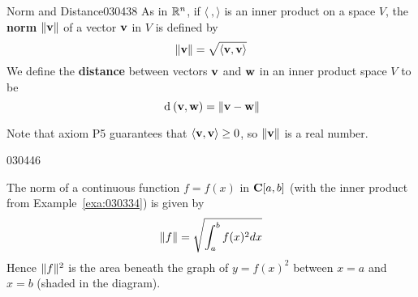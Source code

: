 \begin{definition}{Norm and Distance}{030438}
As in $\mathbb{R}^n$, if $\langle\ , \rangle$ is an inner product on a space $V$, the \textbf{norm}\footnotemark {}
 $\|\textbf{v}\|$ of a vector $\textbf{v}$ in $V$ is defined by
\begin{equation*}
\| \textbf{v} \| = \sqrt{\langle \textbf{v}, \textbf{v} \rangle}
\end{equation*}
We define the \textbf{distance} between vectors $\textbf{v}$ and $\textbf{w}$ in an inner product space $V$ to be
\begin{equation*}
\thinspace\operatorname{d\medspace}(\textbf{v}, \textbf{w}) = \| \textbf{v} - \textbf{w} \|
\end{equation*}
\end{definition}

\noindent Note that axiom P5 guarantees that
$\langle\textbf{v}, \textbf{v}\rangle \geq 0$, so $\|\textbf{v}\|$ is a real number.

\begin{example}{}{030446}
\begin{wrapfigure}{l}{6cm} 
\vspace*{-1.5em}
\centering

\end{wrapfigure}

\setlength{\rightskip}{0pt plus 200pt}
The norm of a continuous function $f = f(x)$ in $\textbf{C}[a, b]$ (with the inner product from Example~\ref{exa:030334}) is given by
\begin{equation*}
\| f \| = \sqrt{\int_{a}^{b} f(x)^2dx}
\end{equation*}
Hence $\| f\|^{2}$ is the area beneath the graph of $y = f(x)^{2}$ between $x = a$ and $x = b$ (shaded in the diagram).
\end{example}

